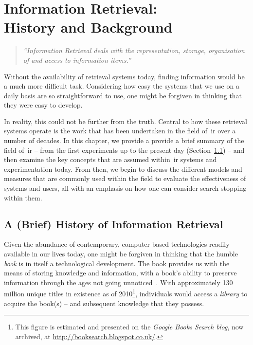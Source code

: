 
\chapter[Information Retrieval]{Information Retrieval:\\History and Background}\label{chap:ir}

\begin{quote}
    \emph{``Information Retrieval deals with the representation, storage, organisation of and access to information items.''}
\end{quote}

Without the availability of retrieval systems today, finding information would be a much more difficult task. Considering how easy the systems that we use on a daily basis are so straightforward to use, one might be forgiven in thinking that they were easy to develop.

In reality, this could not be further from the truth. Central to how these retrieval systems operate is the work that has been undertaken in the field of~\gls{ir} over a number of decades. In this chapter, we provide a provide a brief summary of the field of~\gls{ir} -- from the first experiments up to the present day (Section~\ref{sec:ir:history}) -- and then examine the key concepts that are assumed within~\gls{ir} systems and experimentation today. From then, we begin to discuss the different models and measures that are commonly used within the field to evaluate the effectiveness of systems and users, all with an emphasis on how one can consider search stopping within them.

\section[A (Brief) History]{A (Brief) History of Information Retrieval}\label{sec:ir:history}
Given the abundance of contemporary, computer-based technologies readily available in our lives today, one might be forgiven in thinking that the humble \emph{book} is in itself a technological development. The book provides us with the means of storing knowledge and information, with a book's ability to preserve information through the ages not going unnoticed~\citep{hedstrom1997digital_preservation}. With approximately 130 million unique titles in existence as of 2010\footnote{This figure is estimated and presented on the \emph{Google Books Search blog}, now archived, at \url{http://booksearch.blogspot.co.uk/}.}, individuals would access a \emph{library} to acquire the book(s) -- and subsequent knowledge that they possess.


